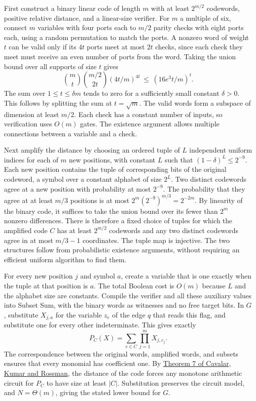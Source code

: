 \documentclass[11pt,a4paper]{article}
\numberwithin{equation}{section}
\begin{document}
First construct a binary linear code of length \(m\) with at least \(2^{m/2}\) codewords, positive relative distance, and a linear-size verifier. For \(m\) a multiple of six, connect \(m\) variables with four ports each to \(m/2\) parity checks with eight ports each, using a random permutation to match the ports. A nonzero word of weight \(t\) can be valid only if its \(4t\) ports meet at most \(2t\) checks, since each check they meet must receive an even number of ports from the word. Taking the union bound over all supports of size \(t\) gives
\begin{equation}\label{eq:code-union-bound}
\binom{m}{t}\binom{m/2}{2t}(4t/m)^{4t}
\ \le\ (16e^3t/m)^t .
\end{equation}
The sum over \(1\le t\le\delta m\) tends to zero for a sufficiently small constant \(\delta>0\). This follows by splitting the sum at \(t=\sqrt m\). The valid words form a subspace of dimension at least \(m/2\). Each check has a constant number of inputs, so verification uses \(O(m)\) gates. The existence argument allows multiple connections between a variable and a check.

Next amplify the distance by choosing an ordered tuple of \(L\) independent uniform indices for each of \(m\) new positions, with constant \(L\) such that \((1-\delta)^L\le2^{-9}\). Each new position contains the tuple of corresponding bits of the original codeword, a symbol over a constant alphabet of size \(2^L\). Two distinct codewords agree at a new position with probability at most \(2^{-9}\). The probability that they agree at at least \(m/3\) positions is at most \(2^m(2^{-9})^{m/3}=2^{-2m}\). By linearity of the binary code, it suffices to take the union bound over its fewer than \(2^m\) nonzero differences. There is therefore a fixed choice of tuples for which the amplified code \(C\) has at least \(2^{m/2}\) codewords and any two distinct codewords agree in at most \(m/3-1\) coordinates. The tuple map is injective. The two structures follow from probabilistic existence arguments, without requiring an efficient uniform algorithm to find them.

For every new position \(j\) and symbol \(a\), create a variable that is one exactly when the tuple at that position is \(a\). The total Boolean cost is \(O(m)\) because \(L\) and the alphabet size are constants. Compile the verifier and all these auxiliary values into Subset Sum, with the binary words as witnesses and no free target bits. In \(G\), substitute \(X_{j,a}\) for the variable \(z_e\) of the edge \(q\) that reads this flag, and substitute one for every other indeterminate. This gives exactly
\begin{equation}\label{eq:code-polynomial}
P_C(X)=\sum_{c\in C}\prod_{j=1}^m X_{j,c_j}.
\end{equation}
The correspondence between the original words, amplified words, and subsets ensures that every monomial has coefficient one. By \href{https://pmc.ncbi.nlm.nih.gov/articles/PMC9705498/}{Theorem 7 of Cavalar, Kumar and Rossman}, the distance of the code forces any monotone arithmetic circuit for \(P_C\) to have size at least \(|C|\). Substitution preserves the circuit model, and \(N=\Theta(m)\), giving the stated lower bound for \(G\).
\end{document}
